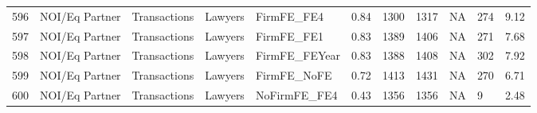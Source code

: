 \documentclass{article}
\begin{document}
\begin{table}[H]
\begin{tabular}{rllllllllll}
  596 & NOI/Eq Partner & Transactions & Lawyers & FirmFE\_FE4 & 0.84 & 1300 & 1317 & NA & 274 & 9.12 \\
  597 & NOI/Eq Partner & Transactions & Lawyers & FirmFE\_FE1 & 0.83 & 1389 & 1406 & NA & 271 & 7.68 \\
  598 & NOI/Eq Partner & Transactions & Lawyers & FirmFE\_FEYear & 0.83 & 1388 & 1408 & NA & 302 & 7.92 \\
  599 & NOI/Eq Partner & Transactions & Lawyers & FirmFE\_NoFE & 0.72 & 1413 & 1431 & NA & 270 & 6.71 \\
  600 & NOI/Eq Partner & Transactions & Lawyers & NoFirmFE\_FE4 & 0.43 & 1356 & 1356 & NA & 9 & 2.48 \\
   \hline
\end{tabular}
\end{table}
\end{document}
